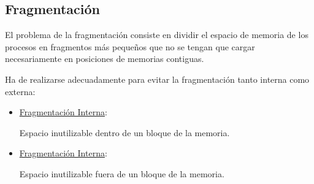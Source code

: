 \subsection{Fragmentación}
El problema de la fragmentación consiste en dividir el espacio de memoria de los procesos en fragmentos más pequeños que no se tengan que cargar necesariamente en posiciones de memorias contiguas.

Ha de realizarse adecuadamente para evitar la fragmentación tanto interna como externa:
\begin{itemize}
    \item \underline{Fragmentación Interna}:

    Espacio inutilizable dentro de un bloque de la memoria.
    \item \underline{Fragmentación Interna}:

    Espacio inutilizable fuera de un bloque de la memoria.
\end{itemize}

